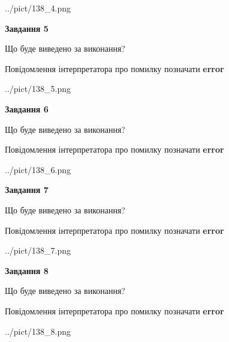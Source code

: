 \documentclass[12pt, ukrainian]{article}
\begin{document}
{\begin{center}
	{../pict/138_4.png}
\end{center}
\newpage

{\begin {center}\textbf{Завдання 5}\end {center}}\par
Що буде виведено за виконання? \par
Повідомлення інтерпретатора про помилку позначати \textbf{error}

\begin{center}
	{../pict/138_5.png}
\end{center}
\newpage

{\begin {center}\textbf{Завдання 6}\end {center}}\par
Що буде виведено за виконання? \par
Повідомлення інтерпретатора про помилку позначати \textbf{error}

\begin{center}
	{../pict/138_6.png}
\end{center}
\newpage

{\begin {center}\textbf{Завдання 7}\end {center}}\par
Що буде виведено за виконання? \par
Повідомлення інтерпретатора про помилку позначати \textbf{error}

\begin{center}
	{../pict/138_7.png}
\end{center}
\newpage

{\begin {center}\textbf{Завдання 8}\end {center}}\par
Що буде виведено за виконання? \par
Повідомлення інтерпретатора про помилку позначати \textbf{error}

\begin{center}
	{../pict/138_8.png}
\end{center}
\newpage

}
\end{document}
